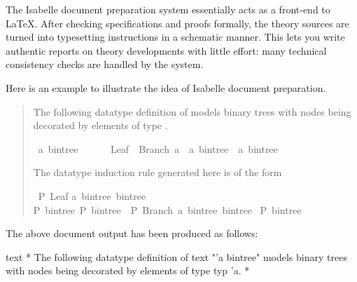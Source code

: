 \begin{isabellebody}
\begin{isamarkuptext}
  \medskip The Isabelle document preparation system essentially acts
  as a front-end to {\LaTeX}.  After checking specifications and
  proofs formally, the theory sources are turned into typesetting
  instructions in a schematic manner.  This lets you write authentic
  reports on theory developments with little effort: many technical
  consistency checks are handled by the system.

  Here is an example to illustrate the idea of Isabelle document
  preparation.%
\end{isamarkuptext}%
\isamarkuptrue%
%
\begin{quotation}
%
\begin{isamarkuptext}%
The following datatype definition of  models
  binary trees with nodes being decorated by elements of type .%
\end{isamarkuptext}%
\isamarkuptrue%
\isamarkupfalse%
\ {\isacharprime}a\ bintree\ {\isacharequal}\isanewline
\ \ \ \ \ Leaf\ {\isacharbar}\ Branch\ {\isacharprime}a\ \ {\isachardoublequoteopen}{\isacharprime}a\ bintree{\isachardoublequoteclose}\ \ {\isachardoublequoteopen}{\isacharprime}a\ bintree{\isachardoublequoteclose}%
\begin{isamarkuptext}%
\noindent The datatype induction rule generated here is of the form
  \begin{isabelle}%
\ {\isasymlbrakk}P\ Leaf{\isacharsemicolon}\isanewline
\isaindent{\ \ }{\isasymAnd}a\ bintree{}\ bintree{}{\isachardot}\isanewline
\isaindent{\ \ \ \ \ }{\isasymlbrakk}P\ bintree{}{\isacharsemicolon}\ P\ bintree{}{\isasymrbrakk}\ {\isasymLongrightarrow}\ P\ {\isacharparenleft}Branch\ a\ bintree{}\ bintree{}{\isacharparenright}{\isasymrbrakk}\isanewline
\isaindent{\ }{\isasymLongrightarrow}\ P\ bintree%
\end{isabelle}%
\end{isamarkuptext}%
\isamarkuptrue%
%
\end{quotation}
%
\begin{isamarkuptext}%
\noindent The above document output has been produced as follows:

  \begin{ttbox}
  text {\ttlbrace}*
    The following datatype definition of {\at}{\ttlbrace}text "'a bintree"{\ttrbrace}
    models binary trees with nodes being decorated by elements
    of type {\at}{\ttlbrace}typ 'a{\ttrbrace}.
  *{\ttrbrace}


\end{ttbox}
\end{isamarkuptext}
\end{isabellebody}

